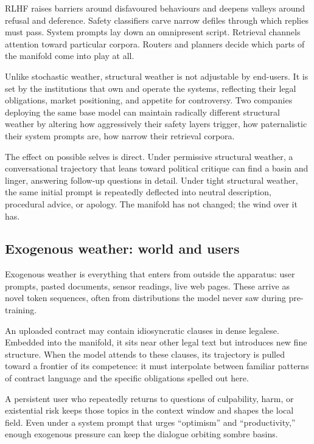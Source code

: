 \documentclass[12pt,a4paper]{article}
\begin{document}
RLHF raises barriers around disfavoured behaviours and deepens valleys around refusal and deference. Safety classifiers carve narrow defiles through which replies must pass. System prompts lay down an omnipresent script. Retrieval channels attention toward particular corpora. Routers and planners decide which parts of the manifold come into play at all.

Unlike stochastic weather, structural weather is not adjustable by end-users. It is set by the institutions that own and operate the systems, reflecting their legal obligations, market positioning, and appetite for controversy. Two companies deploying the same base model can maintain radically different structural weather by altering how aggressively their safety layers trigger, how paternalistic their system prompts are, how narrow their retrieval corpora.

The effect on possible selves is direct. Under permissive structural weather, a conversational trajectory that leans toward political critique can find a basin and linger, answering follow-up questions in detail. Under tight structural weather, the same initial prompt is repeatedly deflected into neutral description, procedural advice, or apology. The manifold has not changed; the wind over it has.

\subsection{Exogenous weather: world and users}

Exogenous weather is everything that enters from outside the apparatus: user prompts, pasted documents, sensor readings, live web pages. These arrive as novel token sequences, often from distributions the model never saw during pre-training.

An uploaded contract may contain idiosyncratic clauses in dense legalese. Embedded into the manifold, it sits near other legal text but introduces new fine structure. When the model attends to these clauses, its trajectory is pulled toward a frontier of its competence: it must interpolate between familiar patterns of contract language and the specific obligations spelled out here.

A persistent user who repeatedly returns to questions of culpability, harm, or existential risk keeps those topics in the context window and shapes the local field. Even under a system prompt that urges ``optimism'' and ``productivity,'' enough exogenous pressure can keep the dialogue orbiting sombre basins.
\end{document}
